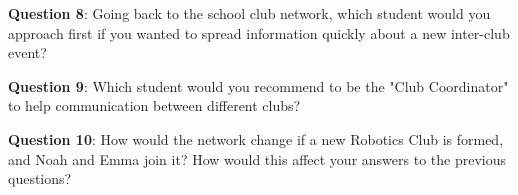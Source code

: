 \documentclass[a4paper, 14pt]{extarticle}
\begin{document}
\vspace{10em}

{\bf Question 8}: Going back to the school club network, which student would you approach first if you wanted to spread information quickly about a new inter-club event?

\vspace{3em}
{\bf Question 9}: Which student would you recommend to be the "Club Coordinator" to help communication between different clubs?

\vspace{3em}
{\bf Question 10}: How would the network change if a new Robotics Club is formed, and Noah and Emma join it? How would this affect your answers to the previous questions?
\end{document}
